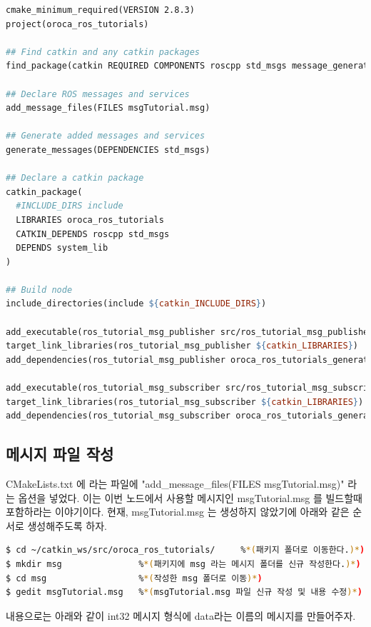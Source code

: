 \begin{lstlisting}[language=make]
cmake_minimum_required(VERSION 2.8.3)
project(oroca_ros_tutorials)

## Find catkin and any catkin packages
find_package(catkin REQUIRED COMPONENTS roscpp std_msgs message_generation)

## Declare ROS messages and services
add_message_files(FILES msgTutorial.msg)

## Generate added messages and services
generate_messages(DEPENDENCIES std_msgs)

## Declare a catkin package
catkin_package(
  #INCLUDE_DIRS include
  LIBRARIES oroca_ros_tutorials
  CATKIN_DEPENDS roscpp std_msgs
  DEPENDS system_lib
)

## Build node
include_directories(include ${catkin_INCLUDE_DIRS})

add_executable(ros_tutorial_msg_publisher src/ros_tutorial_msg_publisher.cpp)
target_link_libraries(ros_tutorial_msg_publisher ${catkin_LIBRARIES})
add_dependencies(ros_tutorial_msg_publisher oroca_ros_tutorials_generate_messages_cpp)

add_executable(ros_tutorial_msg_subscriber src/ros_tutorial_msg_subscriber.cpp)
target_link_libraries(ros_tutorial_msg_subscriber ${catkin_LIBRARIES})
add_dependencies(ros_tutorial_msg_subscriber oroca_ros_tutorials_generate_messages_cpp)
\end{lstlisting}

\subsection{메시지 파일 작성}

CMakeLists.txt 에 라는 파일에 "add\_message\_files(FILES msgTutorial.msg)" 라는 옵션을 넣었다. 이는 이번 노드에서 사용할 메시지인 msgTutorial.msg 를 빌드할때 포함하라는 이야기이다. 현재, msgTutorial.msg 는 생성하지 않았기에 아래와 같은 순서로 생성해주도록 하자.

\begin{lstlisting}[language=bash]
$ cd ~/catkin_ws/src/oroca_ros_tutorials/     %*(패키지 폴더로 이동한다.)*)
$ mkdir msg               %*(패키지에 msg 라는 메시지 폴더를 신규 작성한다.)*)
$ cd msg                  %*(작성한 msg 폴더로 이동)*)
$ gedit msgTutorial.msg   %*(msgTutorial.msg 파일 신규 작성 및 내용 수정)*)
\end{lstlisting}

내용으로는 아래와 같이 int32 메시지 형식에 data라는 이름의 메시지를 만들어주자.

